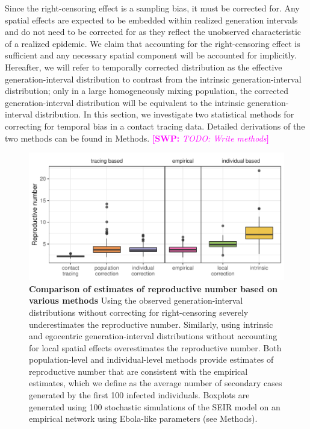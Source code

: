 \documentclass[12pt]{article}
\newcommand{\comment}[3]{\textcolor{#1}{\textbf{[#2: }\textsl{#3}\textbf{]}}}
\newcommand{\swp}[1]{\comment{magenta}{SWP}{#1}}
\begin{document}
Since the right-censoring effect is a sampling bias, it must be corrected for.
Any spatial effects are expected to be embedded within realized generation intervals and do not need to be corrected for as they reflect the unobserved characteristic of a realized epidemic.
We claim that accounting for the right-censoring effect is sufficient and any necessary spatial component will be accounted for implicitly.
Hereafter, we will refer to temporally corrected distribution as the effective generation-interval distribution to contrast from the intrinsic generation-interval distribution; only in a large homogeneously mixing population, the corrected generation-interval distribution will be equivalent to the intrinsic generation-interval distribution.
In this section, we investigate two statistical methods for correcting for temporal bias in a contact tracing data.
Detailed derivations of the two methods can be found in Methods.
\swp{TODO: Write methods}


\begin{figure}[ht]
\includegraphics[width=\textwidth]{../fig/cmp_reproductive.pdf}
\caption{\textbf{Comparison of estimates of reproductive number based on various methods}
Using the observed generation-interval distributions without correcting for right-censoring severely underestimates the reproductive number.
Similarly, using intrinsic and egocentric generation-interval distributions without accounting for local spatial effects overestimates the reproductive number.
Both population-level and individual-level methods provide estimates of reproductive number that are consistent with the empirical estimates, which we define as the average number of secondary cases generated by the first 100 infected individuals.
Boxplots are generated using 100 stochastic simulations of the SEIR model on an empirical network using Ebola-like parameters (see Methods).
}
\label{fig:cmp}
\end{figure}
\end{document}
